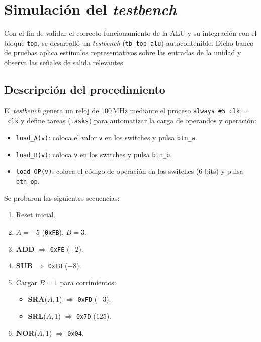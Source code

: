 \section{Simulación del \textit{testbench}}

Con el fin de validar el correcto funcionamiento de la ALU y su integración con el bloque \texttt{top}, se desarrolló un \textit{testbench} (\texttt{tb\_top\_alu}) autocontenible. Dicho banco de pruebas aplica estímulos representativos sobre las entradas de la unidad y observa las señales de salida relevantes.

\subsection{Descripción del procedimiento}
El \textit{testbench} genera un reloj de 100\,MHz mediante el proceso \texttt{always \#5 clk = \string~clk} y define tareas (\texttt{tasks}) para automatizar la carga de operandos y operación:
\begin{itemize}
    \item \texttt{load\_A(v)}: coloca el valor \texttt{v} en los switches y pulsa \texttt{btn\_a}.
    \item \texttt{load\_B(v)}: coloca \texttt{v} en los switches y pulsa \texttt{btn\_b}.
    \item \texttt{load\_OP(v)}: coloca el código de operación en los switches (6 bits) y pulsa \texttt{btn\_op}.
\end{itemize}

Se probaron las siguientes secuencias:
\begin{enumerate}
    \item Reset inicial.
    \item $A = -5$ (\texttt{0xFB}), $B = 3$.
    \item \textbf{ADD} $\Rightarrow$ \texttt{0xFE} ($-2$).
    \item \textbf{SUB} $\Rightarrow$ \texttt{0xF8} ($-8$).
    \item Cargar $B=1$ para corrimientos:
        \begin{itemize}
            \item \textbf{SRA}($A,1$) $\Rightarrow$ \texttt{0xFD} ($-3$).
            \item \textbf{SRL}($A,1$) $\Rightarrow$ \texttt{0x7D} ($125$).
        \end{itemize}
    \item \textbf{NOR}($A,1$) $\Rightarrow$ \texttt{0x04}.
\end{enumerate}

